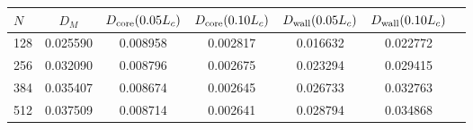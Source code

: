 \begin{tabular}{@{}lcccccc@{}}
\toprule
$N$ & $D_M$ & $D_{\rm core}(0.05L_c)$ & $D_{\rm core}(0.10L_c)$ & $D_{\rm wall}(0.05L_c)$ & $D_{\rm wall}(0.10L_c)$ \\
\midrule
128 & 0.025590 & 0.008958 & 0.002817 & 0.016632 & 0.022772 \\
256 & 0.032090 & 0.008796 & 0.002675 & 0.023294 & 0.029415 \\
384 & 0.035407 & 0.008674 & 0.002645 & 0.026733 & 0.032763 \\
512 & 0.037509 & 0.008714 & 0.002641 & 0.028794 & 0.034868 \\
\bottomrule
\end{tabular}
